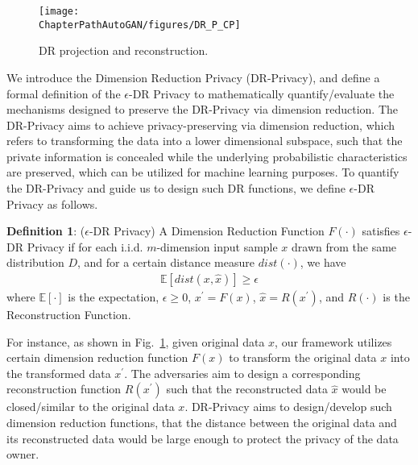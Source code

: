 

\begin{figure}[H]
	\centering
	\texttt{[image: \\ChapterPathAutoGAN/figures/DR\_P\_CP]}
	\caption{DR projection and reconstruction.} 
	\label{fig:DRP}
\end{figure} 

We introduce the Dimension Reduction Privacy (DR-Privacy), and define a formal definition of the $\epsilon$-DR Privacy to mathematically quantify/evaluate the mechanisms designed to preserve the DR-Privacy 
via dimension reduction. The DR-Privacy aims to achieve privacy-preserving via dimension reduction, which refers to transforming the data into a lower dimensional subspace, such that the private information is concealed while the underlying probabilistic characteristics are preserved, which can be utilized for machine learning purposes. To quantify the DR-Privacy and guide us to design such DR functions, we define $\epsilon$-DR Privacy as follows.


{\bf Definition 1}: ($\epsilon$-DR Privacy) A Dimension Reduction Function $F(\cdot)$ satisfies $\epsilon$-DR Privacy if for each i.i.d. $m$-dimension input sample $x$ drawn from the same distribution $D$, and for a certain distance measure $dist(\cdot)$, we have
\begin{equation}
\begin{split} \label{eq:modularity}
\mathbb{E}[dist(x, \hat{x})] \geq \epsilon
\end{split}
\end{equation}
where $\mathbb{E}[\cdot]$ is the expectation, $\epsilon \geq 0$, $x^{\prime}=F(x)$, $\hat{x}=R(x^{\prime})$, and $R(\cdot)$ is the Reconstruction Function.

For instance, as shown in Fig.~\ref{fig:DRP}, given original data $x$, our framework utilizes certain dimension reduction function $F(x)$ to transform the original data $x$ into the transformed data $x^{\prime}$. The adversaries aim to design a corresponding reconstruction function $R(x^{\prime})$ such that the reconstructed data $\hat{x}$ would be closed/similar to the original data $x$. DR-Privacy aims to design/develop such dimension reduction functions, that the distance between the original data and its reconstructed data would be large enough to protect the privacy of the data owner.

